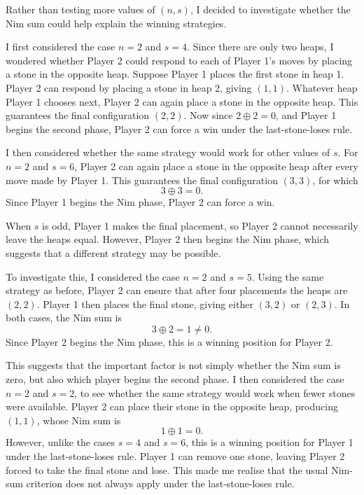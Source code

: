 \documentclass[11pt]{article}
\newcommand{\keywordfont}{\textsc}
\newcommand{\keyword}[1]{%
  \marginpar{\raggedright\small\keywordfont{#1}}}
\begin{document}
\medskip
\keyword{IDEA}
Rather than testing more values of $(n,s)$,
I decided to investigate whether the Nim sum could help explain the winning strategies.

\medskip
\keyword{ATTEMPT}
I first considered the case $n=2$ and $s=4$. Since there are only two heaps, I wondered whether Player 2 could respond to each of Player 1's moves by placing a stone in the opposite heap.
Suppose Player 1 places the first stone in
heap 1. Player 2 can respond by placing a
stone in heap 2, giving $(1,1)$.
Whatever heap Player 1 chooses next, Player 2 can again place a stone in the opposite heap. This guarantees the final configuration $(2,2)$.
Now since $2\oplus2=0$, and Player 1 begins the second phase, Player 2 can force a win under the last-stone-loses rule.

\medskip
\keyword{CHECK}
I then considered whether the same strategy would work for other values of $s$.
For $n=2$ and $s=6$, Player 2 can again place a stone in the opposite heap after every move made by Player 1. This guarantees the final
configuration $(3,3)$, for which
$$ 3\oplus3=0. $$
Since Player 1 begins the Nim phase, Player 2 can force a win.



\medskip
\keyword{OBSERVE}
When $s$ is odd, Player 1 makes the final
placement, so Player 2 cannot necessarily
leave the heaps equal. However, Player 2
then begins the Nim phase, which suggests
that a different strategy may be possible.


\keyword{CHECK}

To investigate this, I considered the case $n=2$ and $s=5$.
Using the same strategy as before, Player 2 can ensure that after four placements the heaps are $(2,2)$. Player 1 then places the final stone, giving either $(3,2)$ or $(2,3)$. In both cases, the Nim sum is
$$ 3\oplus2=1\neq0.$$
Since Player 2 begins the Nim phase, this is a winning position for Player 2.

\smallskip
\keyword{NOTE}
This suggests that the important factor is not simply whether the Nim sum is zero, but also which player begins the second phase.
I then considered the case $n=2$ and $s=2$,
to see whether the same strategy would work
when fewer stones were available.
Player 2 can place their stone in the
opposite heap, producing $(1,1)$, whose
Nim sum is
$$1\oplus1=0.$$
However, unlike the cases $s=4$ and $s=6$,
this is a winning position for Player 1
under the last-stone-loses rule.
Player 1 can remove one stone, leaving
Player 2 forced to take the final stone
and lose.
This made me realise that the usual
Nim-sum criterion does not always apply
under the last-stone-loses rule.
\end{document}
